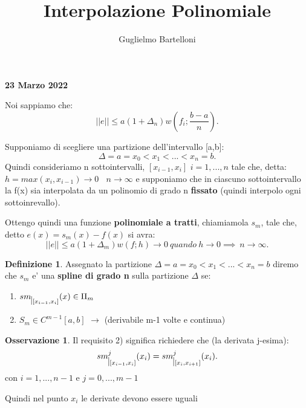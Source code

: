 \documentclass[11pt]{article}
\theoremstyle{definition}
\newtheorem{defn}{Definizione}
\newtheorem{oss}{Osservazione}
\theoremstyle{plain}
\begin{document}
\title{Interpolazione Polinomiale}
\author{Guglielmo Bartelloni}
\maketitle

\thispagestyle{empty}

\begin{center}
{\LARGE \bf 23 Marzo 2022}\\
\end{center}

Noi sappiamo che:
\[
||e||\le a(1+\varDelta_n)w(f_i;\frac{b-a}{n})
.\] 

Supponiamo di scegliere una partizione dell'intervallo [a,b]:
\[
	\varDelta={a=x_0<x_1<...<x_n=b}
.\] 
Quindi consideriamo n sottointervalli, $[x_{i-1},x_{i}]$ $i=1,...,n$ tale che, detta: $h=max(x_{i},x_{i-1})\to 0 \ \ \ \ n\to \infty$
e supponiamo che in ciascuno sottointervallo la f(x) sia interpolata da un polinomio di grado n \textbf{fissato} (quindi interpolo ogni sottoinrevallo).

Ottengo quindi una funzione \textbf{polinomiale a tratti}, chiamiamola $s_m$, tale che, detto $e(x)=s_m(x)-f(x)$ si avra:
\[
	||e||\le a(1+\varDelta_m)w(f;h)\to 0\ quando\ h\to 0 \implies\ n\to \infty
.\] 

\begin{defn}
	Assegnato la partizione $\varDelta={a=x_0<x_1<...<x_n=b}$ diremo che $s_m$ e' una \textbf{spline di grado n} sulla partizione $\varDelta$ se:
	\begin{enumerate}
		\item $sm_{\mkern 1mu \vrule height 2ex\mkern2mu [x_{i-1},x_i]} (x)\in \Pi_m$
		\item $S_m \in C^{m-1}[a,b]$ $\to$  (derivabile m-1 volte e continua)
	\end{enumerate}
\end{defn}
\begin{oss}
	Il requisito 2) significa richiedere che (la derivata j-esima):
	\[
		sm^{j}_{\mkern 1mu \vrule height 2ex\mkern2mu [x_{i-1},x_i]}(x_{i})=sm^{j}_{\mkern 1mu \vrule height 2ex\mkern2mu [x_{i},x_{i+1}]}(x_{i})
	.\] 
con $i=1,...,n-1$ e $j=0,...,m-1$

Quindi nel punto $x_{i}$ le derivate devono essere uguali
\end{oss}
\end{document}
